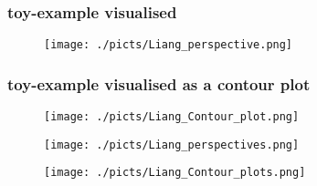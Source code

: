 
\begin{frame}
		\frametitle{toy-example visualised}
	
	\begin{center}
		\begin{figure}\texttt{[image: ./picts/Liang\_perspective.png]}\end{figure}	
	\end{center}	
		
\end{frame}

\begin{frame}
		\frametitle{toy-example visualised as a contour plot}
	
	\begin{center}
		\begin{figure}\texttt{[image: ./picts/Liang\_Contour\_plot.png]}\end{figure}	
	\end{center}	
		
\end{frame}


\begin{frame}[plain]

	\begin{center}
		\begin{figure}\texttt{[image: ./picts/Liang\_perspectives.png]}\end{figure}	
	\end{center}	
		
\end{frame}


\begin{frame}[plain]

	\begin{center}
		\begin{figure}\texttt{[image: ./picts/Liang\_Contour\_plots.png]}\end{figure}	
	\end{center}	
		
\end{frame}



